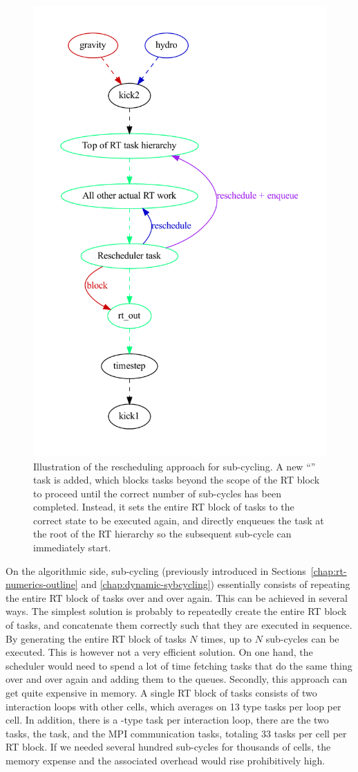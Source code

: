 \begin{figure}
 \centering
 \includegraphics[width=.6\textwidth]{figures/RHD/RTRescheduling.pdf}%
 \caption{
 Illustration of the rescheduling approach for sub-cycling.  A new ``'' task is
added, which blocks tasks beyond the scope of the RT block to proceed until the correct number of
sub-cycles has been completed. Instead, it sets the entire RT block of tasks to the correct state
to be executed again, and directly enqueues the task at the root of the RT hierarchy so the
subsequent sub-cycle can immediately start.
 }
 \label{fig:rescheduling}
\end{figure}





On the algorithmic side, sub-cycling (previously introduced in
Sections~\ref{chap:rt-numerics-outline} and \ref{chap:dynamic-sybcycling}) essentially consists of
repeating the entire RT block of tasks over and over again. This can be achieved in several ways.
The simplest solution is probably to repeatedly create the entire RT block of tasks, and concatenate
them correctly such that they are executed in sequence. By generating the entire RT block of tasks
$N$ times, up to $N$ sub-cycles can be executed. This is however not a very efficient solution. On
one hand, the scheduler would need to spend a lot of time fetching tasks that do the same thing over
and over again and adding them to the queues. Secondly, this approach can get quite expensive in
memory. A single RT block of tasks consists of two interaction loops with other cells, which
averages on 13  type tasks per loop per cell. In addition, there is a -type
task per interaction loop, there are the two  tasks, the  task,
and the MPI communication tasks, totaling 33 tasks per cell per RT block. If we needed several
hundred sub-cycles for thousands of cells, the memory expense and the associated overhead would rise
prohibitively high.

